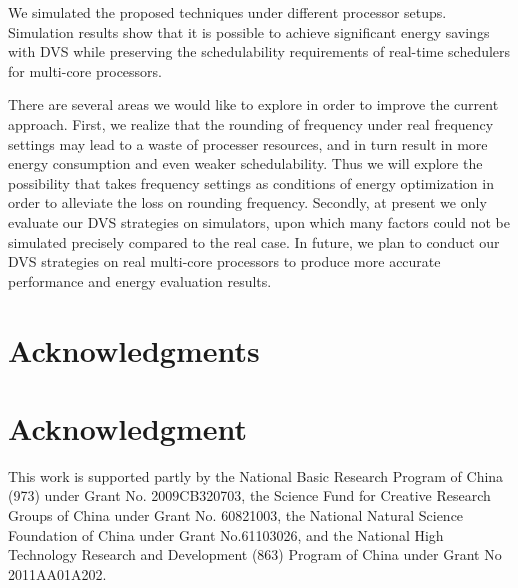 \documentclass[12pt, journal,compsoc]{IEEEtran}
\begin{document}
We simulated the proposed techniques under different processor setups.
Simulation results show that it is possible to achieve significant energy savings with DVS while preserving the schedulability requirements of real-time schedulers for multi-core processors.

There are several areas we would like to explore in order to improve the current approach. First, we realize that the rounding of frequency under real frequency settings may lead to a waste of processer resources, and in turn result in more energy consumption and even weaker schedulability. Thus we will explore the possibility that takes frequency settings as conditions of energy optimization in order to alleviate the loss on rounding frequency. Secondly, at present we only evaluate our DVS strategies on simulators, upon which many factors could not be simulated precisely compared to the real case. In future, we plan to conduct our DVS strategies on real multi-core processors to produce more accurate performance and energy evaluation results.















\ifCLASSOPTIONcompsoc
\section*{Acknowledgments}
\else
\section*{Acknowledgment}
\fi

This work is supported partly by the National Basic Research Program of China (973) under Grant No. 2009CB320703, the Science Fund for
Creative Research Groups of China under Grant No. 60821003,
the National Natural Science Foundation of China under Grant No.61103026, and the National High Technology Research and Development (863) Program  of China under Grant No 2011AA01A202.


\ifCLASSOPTIONcaptionsoff
  \newpage
\fi




























\balance
\end{document}
